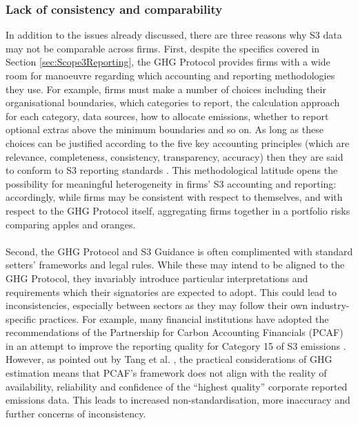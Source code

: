 \documentclass[12pt,twoside]{report}
\begin{document}
\subsubsection{Lack of consistency and comparability}
In addition to the issues already discussed, there are three reasons why S3 data may not be comparable across firms. First, despite the specifics covered in Section \ref{sec:Scope3Reporting}, the GHG Protocol provides firms with a wide room for manoeuvre regarding which accounting and reporting methodologies they use. For example, firms must make a number of choices including their organisational boundaries, which categories to report, the calculation approach for each category, data sources, how to allocate emissions, whether to report optional extras above the minimum boundaries and so on. As long as these choices can be justified according to the five key accounting principles (which are relevance, completeness, consistency, transparency, accuracy) then they are said to conform to S3 reporting standards \cite{ghgscope32013}. This methodological latitude opens the possibility for meaningful heterogeneity in firms' S3 accounting and reporting: accordingly, while firms may be consistent with respect to themselves, and with respect to the GHG Protocol itself, aggregating firms together in a portfolio risks comparing apples and oranges. 
\\ \\
Second, the GHG Protocol and S3 Guidance is often complimented with standard setters' frameworks and legal rules. While these may intend to be aligned to the GHG Protocol, they invariably introduce particular interpretations and requirements which their signatories are expected to adopt. This could lead to inconsistencies, especially between sectors as they may follow their own industry-specific practices. For example, many financial institutions have adopted the recommendations of the Partnership for Carbon Accounting Financials (PCAF) in an attempt to improve the reporting quality for Category 15 of S3 emissions \cite{PCAF2022}. However, as pointed out by Tang et al. \cite{Tang2023}, the practical considerations of GHG estimation means that PCAF's framework does not align with the reality of availability, reliability and confidence of the ``highest quality'' corporate reported emissions data. This leads to increased non-standardisation, more inaccuracy and further concerns of inconsistency. 
\\ \\
\end{document}

